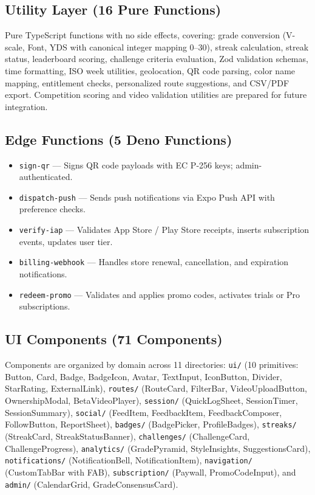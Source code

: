 \documentclass[12pt,a4paper]{report}
\renewcommand\_{\textunderscore\hspace{0pt}}
\begin{document}
\subsection{Utility Layer (16 Pure Functions)}

Pure TypeScript functions with no side effects, covering: grade conversion (V-scale, Font, YDS with canonical integer mapping 0--30), streak calculation, streak status, leaderboard scoring, challenge criteria evaluation, Zod validation schemas, time formatting, ISO week utilities, geolocation, QR code parsing, color name mapping, entitlement checks, personalized route suggestions, and CSV/PDF export. Competition scoring and video validation utilities are prepared for future integration.

\subsection{Edge Functions (5 Deno Functions)}

\begin{itemize}[noitemsep]
    \item \texttt{sign-qr} --- Signs QR code payloads with EC P-256 keys; admin-authenticated.
    \item \texttt{dispatch-push} --- Sends push notifications via Expo Push API with preference checks.
    \item \texttt{verify-iap} --- Validates App Store / Play Store receipts, inserts subscription events, updates user tier.
    \item \texttt{billing-webhook} --- Handles store renewal, cancellation, and expiration notifications.
    \item \texttt{redeem-promo} --- Validates and applies promo codes, activates trials or Pro subscriptions.
\end{itemize}

\subsection{UI Components (71 Components)}

Components are organized by domain across 11 directories: \texttt{ui/} (10 primitives: Button, Card, Badge, BadgeIcon, Avatar, TextInput, IconButton, Divider, StarRating, ExternalLink), \texttt{routes/} (RouteCard, FilterBar, VideoUploadButton, OwnershipModal, BetaVideoPlayer), \texttt{session/} (QuickLogSheet, SessionTimer, SessionSummary), \texttt{social/} (FeedItem, FeedbackItem, FeedbackComposer, FollowButton, ReportSheet), \texttt{badges/} (BadgePicker, ProfileBadges), \texttt{streaks/} (StreakCard, StreakStatusBanner), \texttt{challenges/} (ChallengeCard, ChallengeProgress), \texttt{analytics/} (GradePyramid, StyleInsights, SuggestionsCard), \texttt{notifications/} (NotificationBell, NotificationItem), \texttt{navigation/} (CustomTabBar with FAB), \texttt{subscription/} (Paywall, PromoCodeInput), and \texttt{admin/} (CalendarGrid, GradeConsensusCard).
\end{document}
